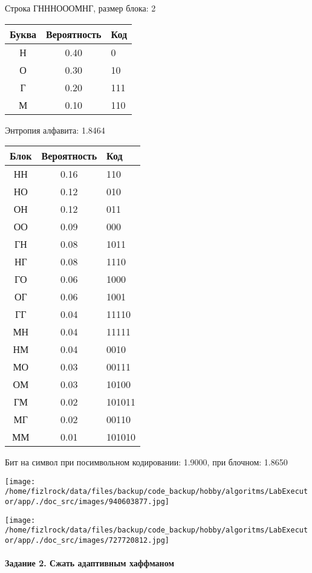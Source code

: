 \documentclass[a4paper, 12pt]{article}
\begin{document}
Строка ГНННОООМНГ, размер блока: 2
\begin{center}
 \begin{tabular}{ |c|c|l| } 
  \hline
     Буква & Вероятность & Код\\ \hline
Н & 0.40 & 0\\\hline
О & 0.30 & 10\\\hline
Г & 0.20 & 111\\\hline
М & 0.10 & 110
\\ \hline \end{tabular}
\end{center}
Энтропия алфавита: 1.8464
\begin{center}
 \begin{tabular}{ |c|c|l| } 
  \hline
     Блок & Вероятность & Код\\ \hline
НН & 0.16 & 110\\\hline
НО & 0.12 & 010\\\hline
ОН & 0.12 & 011\\\hline
ОО & 0.09 & 000\\\hline
ГН & 0.08 & 1011\\\hline
НГ & 0.08 & 1110\\\hline
ГО & 0.06 & 1000\\\hline
ОГ & 0.06 & 1001\\\hline
ГГ & 0.04 & 11110\\\hline
МН & 0.04 & 11111\\\hline
НМ & 0.04 & 0010\\\hline
МО & 0.03 & 00111\\\hline
ОМ & 0.03 & 10100\\\hline
ГМ & 0.02 & 101011\\\hline
МГ & 0.02 & 00110\\\hline
ММ & 0.01 & 101010
\\ \hline \end{tabular}
\end{center}
Бит на символ при посимвольном кодировании: 1.9000, при блочном: 1.8650

\texttt{[image: /home/fizlrock/data/files/backup/code\_backup/hobby/algoritms/LabExecutor/app/./doc\_src/images/940603877.jpg]}

\texttt{[image: /home/fizlrock/data/files/backup/code\_backup/hobby/algoritms/LabExecutor/app/./doc\_src/images/727720812.jpg]}
\pagebreak
\paragraph{Задание 2. Сжать адаптивным хаффманом\\}
\end{document}
